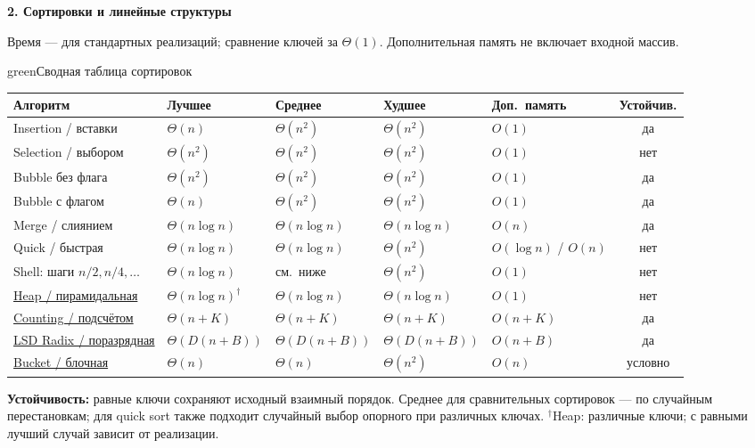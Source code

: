\documentclass[a4paper,10pt]{article}
\renewcommand{\arraystretch}{1.12}
\newcommand{\key}[1]{\textbf{#1}}
\newcommand{\pagehead}[2]{%
 {\color{ink}\fontsize{17}{19}\selectfont\bfseries #1\par}
 \vspace{1mm}
 {\fontsize{9}{10}\selectfont\color{ink}#2\par}\vspace{3mm}}
\begin{document}
\newpage

\begingroup
\fontsize{10}{11}\selectfont
\setlength{\parskip}{1.2pt}
\renewcommand{\arraystretch}{1.0}
\pagehead{2. Сортировки и линейные структуры}
{Время --- для стандартных реализаций; сравнение ключей за $\Theta(1)$. Дополнительная память не включает входной массив.}
\begin{card}{green}{Сводная таблица сортировок}
{\fontsize{10}{11.4}\selectfont
\begin{tabularx}{\linewidth}{@{}Yllllc@{}}
\toprule
Алгоритм & Лучшее & Среднее & Худшее & Доп.\ память & Устойчив.\\\midrule
{}
Insertion / вставки\smash{\textsuperscript{*}} & $\Theta(n)$ & $\Theta(n^2)$ & $\Theta(n^2)$ & $O(1)$ & да\\
Selection / выбором\smash{\textsuperscript{*}} & $\Theta(n^2)$ & $\Theta(n^2)$ & $\Theta(n^2)$ & $O(1)$ & нет\\
Bubble без флага\smash{\textsuperscript{*}} & $\Theta(n^2)$ & $\Theta(n^2)$ & $\Theta(n^2)$ & $O(1)$ & да\\
Bubble с флагом\smash{\textsuperscript{*}} & $\Theta(n)$ & $\Theta(n^2)$ & $\Theta(n^2)$ & $O(1)$ & да\\
Merge / слиянием\smash{\textsuperscript{*}} & $\Theta(n\log n)$ & $\Theta(n\log n)$ & $\Theta(n\log n)$ & $O(n)$ & да\\
Quick / быстрая\smash{\textsuperscript{*}} & $\Theta(n\log n)$ & $\Theta(n\log n)$ & $\Theta(n^2)$ & $O(\log n)$ / $O(n)$ & нет\\
Shell: шаги $n/2,n/4,\ldots$ & $\Theta(n\log n)$ & см.\ ниже & $\Theta(n^2)$ & $O(1)$ & нет\\
\href{https://algs4.cs.princeton.edu/cheatsheet/}{Heap / пирамидальная} & $\Theta(n\log n)^{\dagger}$ & $\Theta(n\log n)$ & $\Theta(n\log n)$ & $O(1)$ & нет\\\midrule
\href{https://ocw.mit.edu/courses/6-006-introduction-to-algorithms-fall-2011/resources/mit6_006f11_lec07_orig/}{Counting / подсчётом} & $\Theta(n+K)$ & $\Theta(n+K)$ & $\Theta(n+K)$ & $O(n+K)$ & да\\
\href{https://ocw.mit.edu/courses/6-006-introduction-to-algorithms-fall-2011/resources/mit6_006f11_lec07_orig/}{LSD Radix / поразрядная} & $\Theta(D(n+B))$ & $\Theta(D(n+B))$ & $\Theta(D(n+B))$ & $O(n+B)$ & да\\
\href{https://belohlavek.inf.upol.cz/vyuka/Cormen-bucket-sort-analysis.pdf}{Bucket / блочная} & $\Theta(n)$ & $\Theta(n)$ & $\Theta(n^2)$ & $O(n)$ & условно\\\bottomrule
\end{tabularx}
}
\key{Устойчивость:} равные ключи сохраняют исходный взаимный порядок.
Среднее для сравнительных сортировок --- по случайным перестановкам;
для quick sort также подходит случайный выбор опорного при различных ключах.
$^{\dagger}$Heap: различные ключи; с равными лучший случай зависит от реализации.
\end{card}
\end{document}
